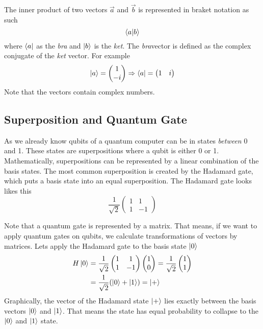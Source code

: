 The inner product of two vectors $\vec a$ and $\vec b$ is represented in braket notation as such 
\begin{equation}
    \braket{a | b}
\end{equation}
where $\bra a$ as the \textit{bra} and $\ket b$ is the \textit{ket}.
The \textit{bra}vector is defined as the complex conjugate of the \textit{ket} vector. 
For example
\begin{equation}
  \ket a=  \begin{pmatrix}1\\-i\end{pmatrix}  \Rightarrow \bra a = \begin{pmatrix}1 & i\end{pmatrix}
\end{equation}
Note that the vectors contain complex numbers.

\subsection{Superposition and Quantum Gate}
As we already know qubits of a quantum computer can be in states \textit{between} 0 and 1. 
These states are superpositions where a qubit is either 0 or 1.
Mathematically, superpositions can be represented by a linear combination of the basis states. 
The most common superposition is created by the Hadamard gate, which puts a basis state into an equal superposition. 
The Hadamard gate looks likes this
\begin{equation}
    \frac{1}{\sqrt{2}} \begin{pmatrix}1 & 1\\ 1 & -1\end{pmatrix}  
\end{equation}

Note that a quantum gate is represented by a matrix.
That means, if we want to apply quantum gates on qubits, we calculate transformations of vectors by matrices. 
Lets apply the Hadamard gate to the basis state $\ket 0$
\begin{equation}
   \begin{split}
   H \ket 0 &=  \frac{1}{\sqrt{2}} \begin{pmatrix}1 & 1\\ 1 & -1\end{pmatrix} \begin{pmatrix}1\\0\end{pmatrix}   
    =  \frac{1}{\sqrt{2}} \begin{pmatrix}1\\1\end{pmatrix}   \\
    &=  \frac{1}{\sqrt{2}} (\ket 0 + \ket 1)  = \ket +
   \end{split}
\end{equation}
Graphically, the vector of the Hadamard state $\ket +$ lies exactly between the basis vectors $\ket 0$ and $\ket 1$.
That means the state has equal probability to collapse to the $\ket 0$ and $\ket 1$ state.


